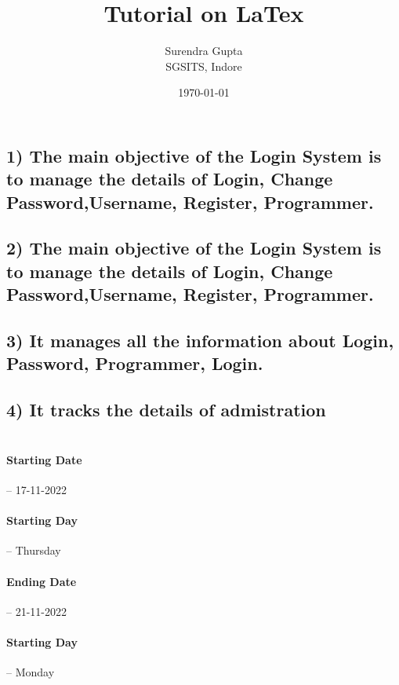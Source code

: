 \documentclass[12pt]{article}
\title{ Tutorial on LaTex}
\author{Surendra Gupta \\ SGSITS, Indore}
\date{\today}
\begin{document}
\maketitle

\pagebreak
\section*{}

\subsection*{1) The main objective of the Login System is to manage the details of Login, Change Password,Username, Register, Programmer.}
\subsection*{2) The main objective of the Login System is to manage the details of Login, Change Password,Username, Register, Programmer.} 
\subsection*{3) It manages all the information about Login, Password, Programmer, Login.}
\subsection*{4) It tracks the details of admistration}

\pagebreak
\section*{}
\subsection*{}
\paragraph{\LARGE Starting Date}-- \large 17-11-2022
\paragraph{\LARGE Starting Day}-- \large Thursday
\paragraph{\LARGE Ending Date}-- \large 21-11-2022
\paragraph{\LARGE Starting Day}-- \large Monday
\end{document}
